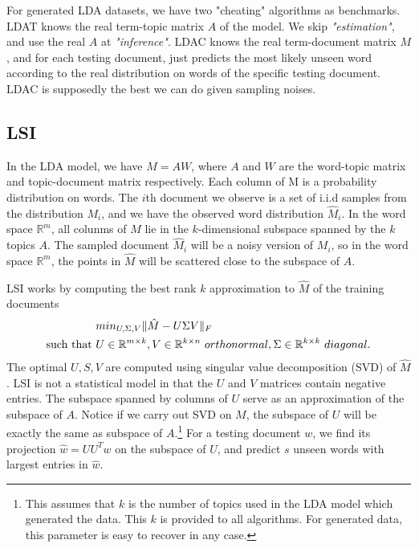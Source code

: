 For generated LDA datasets, we have two "cheating" algorithms as
benchmarks. LDAT knows the real term-topic matrix $A$ of the model. We
skip {\em "estimation"}, and use the real $A$ at {\em
  "inference"}. LDAC knows the real term-document matrix $M$, and for
each testing document, just predicts the most likely unseen word
according to the real distribution on words of the specific testing
document. LDAC is supposedly the best we can do given sampling noises.

\subsection{LSI}
In the LDA model, we have $M=AW$, where $A$ and $W$ are the word-topic matrix and topic-document matrix respectively. Each column of M is a probability distribution on words. The $i$th document we observe is a set of i.i.d samples from the distribution $M_i$, and we have the observed word distribution $\hat{M}_i$. In the word space $\mathbb{R}^m$, all colunms of $M$ lie in the $k$-dimensional subspace spanned by the $k$ topics $A$. The sampled document $\hat{M}_i$ will be a noisy version of $M_i$, so in the word space $\mathbb{R}^m$, the points in $\hat{M}$ will be scattered close to the subspace of $A$.

LSI works by computing the best rank $k$ approximation to $\hat{M}$ of the training documents
\begin{align*}
&min_{U,\Sigma,V}\lVert\hat{M}-U\Sigma V\rVert_F\\
\text{such that } &U\in \mathbb{R}^{m\times k},V\in \mathbb{R}^{k\times n}\text{  } orthonormal, \Sigma\in \mathbb{R}^{k\times k}\text{ }diagonal.
\end{align*}
The optimal $U,S,V$ are computed using singular value decomposition
(SVD) of $\hat{M}$. LSI is not a statistical model in that the $U$ and
$V$ matrices contain negative entries. The subspace spanned by columns
of $U$ serve as an approximation of the subspace of $A$. Notice if we
carry out SVD on $M$, the subspace of $U$ will be exactly the same as
subspace of $A$.\footnote{This assumes that $k$ is the number of
  topics used in the LDA model which generated the data. This $k$ is
  provided to all algorithms. For generated data, this parameter is
  easy to recover in any case.} For a testing document $w$, we find
its projection $\hat{w}=UU^Tw$ on the subspace of $U$, and predict $s$
unseen words with largest entries in $\hat{w}$.

